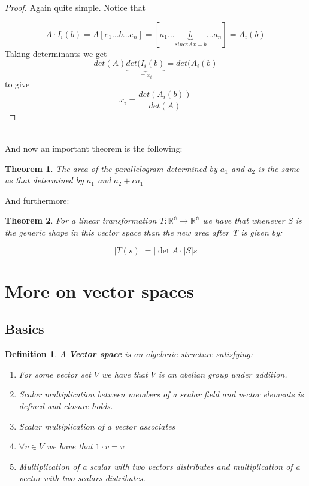 \documentclass{article}
\newtheorem{thm}{Theorem}[subsection]
\newtheorem{definition}{Definition}[subsection]
\numberwithin{equation}{subsection}
\begin{document}
\begin{proof}
Again quite simple. Notice that 

$$A\cdot I_{i}(b) = A[e_{1} \ldots b \dots e_{n}] = [a_{1} \ldots \underbrace{b}_{since Ax = b} \ldots a_{n}] = A_{i}(b)$$
Taking determinants we get $$det(A)\underbrace{det(I_{i}(b)}_{=x_{i}} = det(A_{i}(b)$$ to give $$ x_{i} = \frac{det(A_{i}(b))}{det(A)}$$
\end{proof}
\\
And now an important theorem is the following:

\begin{thm}
The area of the parallelogram determined by $a_{1}$ and $a_{2}$ is the same as that determined by $a_{1}$ and $a_{2} + ca_{1}$
\end{thm}

And furthermore:

\begin{thm}
For a linear transformation $T: \mathbb{R^{n}} \to  \mathbb{R^{n}}$ we have that whenever S is the generic shape in this vector space than the new area after T is given by:

$$ |T(s)| = |\det{A} \cdot |S|s$$
\end{thm}

\clearpage

\section{More on vector spaces}
\subsection{Basics}

\begin{tcolorbox}
\begin{definition}
A \textbf{Vector space} is an algebraic structure satisfying:

\begin{enumerate}
    \item For some vector set $V$ we have that $V$ is an abelian group under addition.
    \item Scalar multiplication between members of a scalar field and vector elements is defined and closure holds.
    \item Scalar multiplication of a vector associates
    \item $\forall v \in V$ we have that $1\cdot v = v$
    \item Multiplication of a scalar with two vectors distributes and multiplication of a vector with two scalars distributes. 
\end{enumerate}
\end{definition}
\end{tcolorbox}
\end{document}
